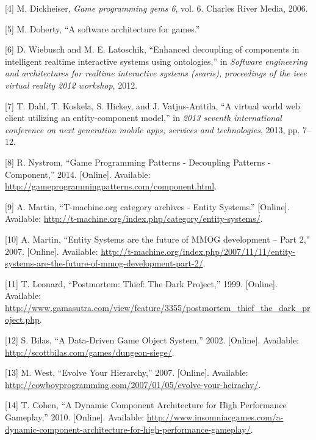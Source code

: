 \documentclass[oneside, 12pt, a4paper, openany]{book}
\begin{document}
\hypertarget{ref-game_programming_gems_6}{}
{[}4{]} M. Dickheiser, \emph{Game programming gems 6}, vol. 6. Charles
River Media, 2006.

\hypertarget{ref-doherty2003software}{}
{[}5{]} M. Doherty, ``A software architecture for games.''

\hypertarget{ref-Wiebusch:2012}{}
{[}6{]} D. Wiebusch and M. E. Latoschik, ``Enhanced decoupling of
components in intelligent realtime interactive systems using
ontologies,'' in \emph{Software engineering and architectures for
realtime interactive systems (searis), proceedings of the ieee virtual
reality 2012 workshop}, 2012.

\hypertarget{ref-6658092}{}
{[}7{]} T. Dahl, T. Koskela, S. Hickey, and J. Vatjus-Anttila, ``A
virtual world web client utilizing an entity-component model,'' in
\emph{2013 seventh international conference on next generation mobile
apps, services and technologies}, 2013, pp. 7--12.

\hypertarget{ref-robertnystorm_gpp_component}{}
{[}8{]} R. Nystrom, ``Game Programming Patterns - Decoupling Patterns -
Component,'' 2014. {[}Online{]}. Available:
\url{http://gameprogrammingpatterns.com/component.html}.

\hypertarget{ref-tmachine_es_category}{}
{[}9{]} A. Martin, ``T-machine.org category archives - Entity Systems.''
{[}Online{]}. Available:
\url{http://t-machine.org/index.php/category/entity-systems/}.

\hypertarget{ref-tmachine_esmmogfuturep2_2007}{}
{[}10{]} A. Martin, ``Entity Systems are the future of MMOG development
-- Part 2,'' 2007. {[}Online{]}. Available:
\url{http://t-machine.org/index.php/2007/11/11/entity-systems-are-the-future-of-mmog-development-part-2/}.

\hypertarget{ref-tomleonard_thiefpostmortem_1999}{}
{[}11{]} T. Leonard, ``Postmortem: Thief: The Dark Project,'' 1999.
{[}Online{]}. Available:
\url{http://www.gamasutra.com/view/feature/3355/postmortem_thief_the_dark_project.php}.

\hypertarget{ref-scottbilas_dungeonsiege_2002}{}
{[}12{]} S. Bilas, ``A Data-Driven Game Object System,'' 2002.
{[}Online{]}. Available:
\url{http://scottbilas.com/games/dungeon-siege/}.

\hypertarget{ref-mickwest_evolveyourhierarchy_2007}{}
{[}13{]} M. West, ``Evolve Your Hierarchy,'' 2007. {[}Online{]}.
Available:
\url{http://cowboyprogramming.com/2007/01/05/evolve-your-heirachy/}.

\hypertarget{ref-terrancecohen_dynamiccomparchitecture_2010}{}
{[}14{]} T. Cohen, ``A Dynamic Component Architecture for High
Performance Gameplay,'' 2010. {[}Online{]}. Available:
\url{http://www.insomniacgames.com/a-dynamic-component-architecture-for-high-performance-gameplay/}.
\end{document}
